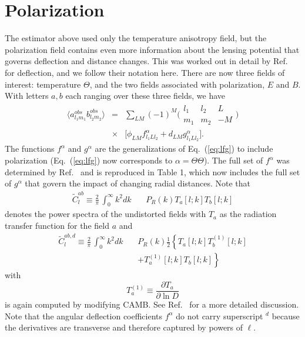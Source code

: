 \documentclass[prl,amsmath,amssymb,floatfix,superscriptaddress,nofootinbib,twocolumn]{revtex4-1}
\def\bea{\begin{eqnarray}}
\def\eea{\end{eqnarray}}
\newcommand{\vs}{\nonumber\\}
\newcommand{\ec}[1]{Eq.~(\ref{eq:#1})}
\newcommand{\wh}[1]{{\color{red} #1}}
\begin{document}
\section{Polarization}

The estimator above used only the temperature anisotropy field, but the polarization field contains even more information about the lensing potential that governs deflection and distance changes. This was worked out in detail by Ref.~\cite{Okamoto:2003zw} for deflection, and we follow their notation here. There are now three fields of interest: temperature $\Theta$, and the two fields associated with polarization, $E$ and $B$. With letters $a,b$ each ranging over these three fields, we have 
\bea
\langle a^{obs}_{l_{1}m_{1}}b^{obs}_{l_{2}m_{2}}\rangle &=& \sum_{LM}(-1)^{M}\bigl(\begin{smallmatrix} l_1 & l_2 & L \\ m_1 & m_2 & -M  \end{smallmatrix}\bigr)\nonumber \\
&\times&
\big[ \phi_{LM}f^{\alpha}_{l_{1}Ll_{2}} + d_{LM}g^{\alpha}_{l_{1}Ll_{2}} \big] 
.\eea
The functions $f^\alpha$ and $g^\alpha$ are the generalizations of \ec{lfg} to include polarization (\ec{lfg} now corresponds to $\alpha=\Theta\Theta$). The full set of $f^{\alpha}$ was determined by Ref.~\cite{Okamoto:2003zw} and is reproduced in Table 1, which now includes the full set of $g^{\alpha}$ that govern the impact of changing radial distances. Note
that
\bea
\tilde{C}^{ab}_{l} \equiv \frac{2}{\pi}\,\int_0^\infty k^{2}dk \,&&{P}_{R}(k) T_{a}[l;k]T_{b}[l;k]\eea
denotes the power spectra of the undistorted fields with $T_a$ as the radiation transfer
function for the field $a$ and \bea
\tilde{C}^{ab,d}_{l} \equiv \frac{2}{\pi}\,\int_0^\infty k^{2}dk \,&&{P}_{R}(k)\frac{1}{2} \left\{T_{a}[l;k]T_{b}^{(1)}[l;k]\right. \vs
&& \left.+ T^{(1)}_{a}[l;k]T_{b}[l;k] \right\}
\eea
with 
\begin{equation}
T_a^{(1)} \equiv \frac{\partial T_a}{\partial \ln D}
\end{equation}
is again computed by modifying CAMB.  
 See Ref.~\cite{Hu:1997de} for a more detailed discussion.
Note that the angular deflection coefficients $f^\alpha$ do not carry superscript $^d$ because the derivatives are transverse and therefore captured by powers of $\ell$. %
\end{document}
